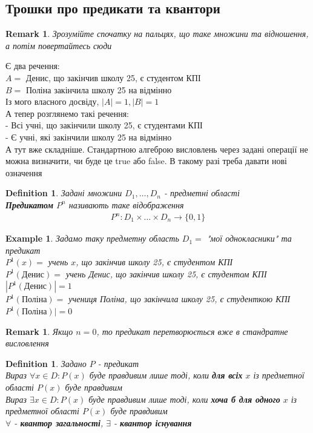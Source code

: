 \documentclass[a4paper, 14pt]{extarticle}
\theoremstyle{theoremdd}
\theoremstyle{theoremdd}
\newtheorem{definition}[theorem]{Definition}
\theoremstyle{theoremdd}
\theoremstyle{theoremdd}
\theoremstyle{theoremdd}
\newtheorem{example}[theorem]{Example}
\theoremstyle{theoremdd}
\theoremstyle{theoremdd}
\theoremstyle{theoremdd}
\theoremstyle{theoremdd}
\theoremstyle{theoremdd}
\theoremstyle{theoremdd}
\newtheorem{remark}[theorem]{Remark}
\theoremstyle{theoremdd}
\theoremstyle{theoremdd}
\theoremstyle{theoremdd}
\theoremstyle{theoremdd}
\begin{document}
\subsection{Трошки про предикати та квантори}
\begin{remark}
Зрозумійте спочатку на пальцях, що таке множини та відношення, а потім повертайтесь сюди
\end{remark}
Є два речення: \\
$A =$ Денис, що закінчив школу 25, є студентом КПІ\\
$B =$ Поліна закінчила школу 25 на відмінно\\
Із мого власного досвіду, $|A| = 1, |B| = 1$
\bigskip \\
А тепер розглянемо такі речення: \\
- Всі учні, що закінчили школу 25, є студентами КПІ\\
- Є учні, які закінчили школу 25 на відмінно\\
А тут вже складніше. Стандартною алгеброю висловлень через задані операції не можна визначити, чи буде це true або false. В такому разі треба давати нові означення
\begin{definition}
Задані множини $D_1,\dots,D_n$ - предметні області\\
\textbf{Предикатом} $P^n$ називають таке відображення
\begin{align*}
P^n: D_1 \times \dots \times D_n \to \{0,1\}
\end{align*}
\end{definition}

\begin{example}
Задамо таку предметну область $D_1 = $ "мої однокласники" та предикат\\
$P^1(x) = $ учень $x$, що закінчив школу 25, є студентом КПІ\\
$P^1(\text{Денис}) =$ учень Денис, що закінчив школу 25, є студентом КПІ \\ $|P^1(\text{Денис})| = 1$\\
$P^1(\text{Поліна}) =$ учениця Поліна, що закінчила школу 25, є студенткою КПІ \\ $P^1(\text{Поліна})| = 0$\\
\end{example}

\begin{remark}
Якщо $n=0$, то предикат перетворюється вже в стандратне висловлення
\end{remark}

\begin{definition}
Задано $P$ - предикат\\
Вираз $\forall x \in D: P(x)$ буде правдивим лише тоді, коли \textbf{для всіх} $x$ із предметної області $P(x)$ буде правдивим\\
Вираз $\exists x \in D: P(x)$ буде правдивим лише тоді, коли \textbf{хоча б для одного} $x$ із предметної області $P(x)$ буде правдивим\\
$\forall$ - \textbf{квантор загальності}, $\exists$ - \textbf{квантор існування}
\end{definition}
\end{document}
